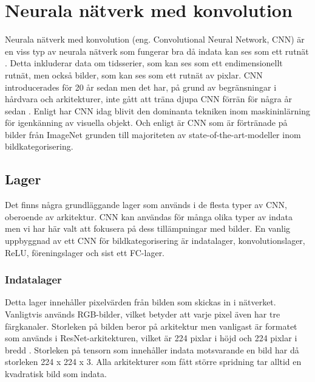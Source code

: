 \documentclass[]{kththesis}
\begin{document}
\section{Neurala nätverk med konvolution}
Neurala nätverk med konvolution (eng. Convolutional Neural Network, CNN) är en viss typ av neurala nätverk som fungerar bra då indata kan ses som ett rutnät \parencite{Goodfellow-et-al-2016}. Detta inkluderar data om tidsserier, som kan ses som ett endimensionellt rutnät, men också bilder, som kan ses som ett rutnät av pixlar. CNN introducerades för 20 år sedan men det har, på grund av begränsningar i hårdvara och arkitekturer, inte gått att träna djupa CNN förrän för några år sedan \parencite{huang2017densely}. Enligt \textcite{huang2017densely} har CNN idag blivit den dominanta tekniken inom maskininlärning för igenkänning av visuella objekt. Och enligt \textcite{simon2016imagenet} är CNN som är förtränade på bilder från ImageNet grunden till majoriteten av state-of-the-art-modeller inom bildkategorisering.

\subsection{Lager}
Det finns några grundläggande lager som används i de flesta typer av CNN, oberoende av arkitektur. CNN kan användas för många olika typer av indata men vi har här valt att fokusera på dess tillämpningar med bilder. En vanlig uppbyggnad av ett CNN för bildkategorisering är indatalager, konvolutionslager, ReLU, föreningslager och sist ett FC-lager.

\subsubsection{Indatalager}
Detta lager innehåller pixelvärden från bilden som skickas in i nätverket. Vanligtvis används RGB-bilder, vilket betyder att varje pixel även har tre färgkanaler. Storleken på bilden beror på arkitektur men vanligast är formatet som används i ResNet-arkitekturen, vilket är 224 pixlar i höjd och 224 pixlar i bredd \parencite{krizhevsky2012imagenet}. Storleken på tensorn som innehåller indata motsvarande en bild har då storleken 224 x 224 x 3. Alla arkitekturer som fått större spridning tar alltid en kvadratisk bild som indata.
\end{document}
